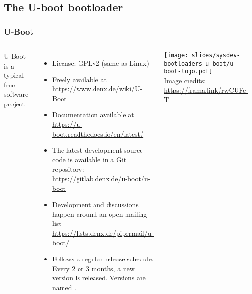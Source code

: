 \subsection{The U-boot bootloader}

\begin{frame}
  \frametitle{U-Boot}
  \begin{columns}
      U-Boot is a typical free software project
      \begin{itemize}
      \item License: GPLv2 (same as Linux)
      \item Freely available at \url{https://www.denx.de/wiki/U-Boot}
      \item Documentation available at
        \url{https://u-boot.readthedocs.io/en/latest/}
      \item The latest development source code is available in a Git
        repository:
        \url{https://gitlab.denx.de/u-boot/u-boot}
      \item Development and discussions happen around an open mailing-list
        \url{https://lists.denx.de/pipermail/u-boot/}
      \item Follows a regular release schedule. Every 2 or 3 months,
        a new version is released. Versions are named .
      \end{itemize}
      \texttt{[image: slides/sysdev-bootloaders-u-boot/u-boot-logo.pdf]}\\
      \tiny Image credits: \url{https://frama.link/rwCUFc-T}
  \end{columns}
\end{frame}

